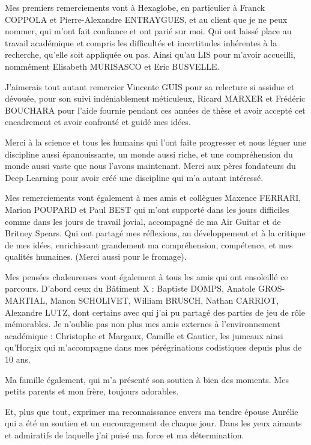 \begin{acknowledgments}

Mes premiers remerciements vont à Hexaglobe, en particulier à Franck COPPOLA et Pierre-Alexandre ENTRAYGUES, et au client que je ne peux nommer, qui m'ont fait confiance et ont parié sur moi. Qui ont laissé place au travail académique et compris les difficultés et incertitudes inhérentes à la recherche, qu'elle soit appliquée ou pas. Ainsi qu'au LIS pour m'avoir accueilli, nommément Elisabeth MURISASCO et Eric BUSVELLE.

J'aimerais tout autant remercier Vincente GUIS pour sa relecture si assidue et dévouée, pour son suivi indéniablement méticuleux, Ricard MARXER et Frédéric BOUCHARA pour l'aide fournie pendant ces années de thèse et avoir accepté cet encadrement et avoir confronté et guidé mes idées.

Merci à la science et tous les humains qui l'ont faite progresser et nous léguer une discipline aussi épanouissante, un monde aussi riche, et une compréhension du monde aussi vaste que nous l'avons maintenant. Merci aux pères fondateurs du Deep Learning pour avoir créé une discipline qui m'a autant intéressé.

Mes remerciements vont également à mes amis et collègues Maxence FERRARI, Marion POUPARD et Paul BEST qui m'ont supporté dans les jours difficiles comme dans les jours de travail jovial, accompagné de ma Air Guitar et de Britney Spears. Qui ont partagé mes réflexions, au développement et à la critique de mes idées, enrichissant grandement ma compréhension, compétence, et mes qualités humaines. (Merci aussi pour le fromage).

Mes pensées chaleureuses vont également à tous les amis qui ont ensoleillé ce parcours. D'abord ceux du Bâtiment X : Baptiste DOMPS, Anatole GROS-MARTIAL, Manon SCHOLIVET, William BRUSCH, Nathan CARRIOT, Alexandre LUTZ, dont certains avec qui j'ai pu partagé des parties de jeu de rôle mémorables. Je n'oublie pas non plus mes amis externes à l'environnement académique : Christophe  et Margaux, Camille et Gautier, les jumeaux ainsi qu'Horgix qui m'accompagne dans mes pérégrinations codistiques depuis plus de 10 ans.

Ma famille également, qui m'a présenté son soutien à bien des moments. Mes petits parents et mon frère, toujours adorables.

Et, plus que tout, exprimer ma reconnaissance envers ma tendre épouse Aurélie qui a été un soutien et un encouragement de chaque jour. Dans les yeux aimants et admiratifs de laquelle j'ai puisé ma force et ma détermination.

\end{acknowledgments}